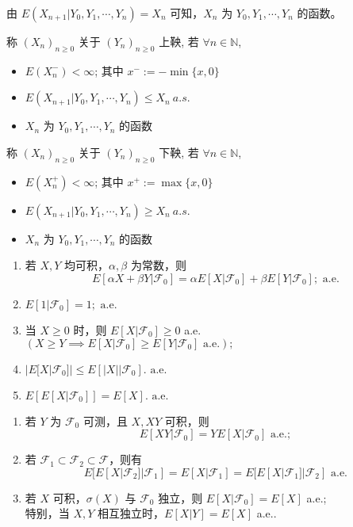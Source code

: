 \documentclass[lang=cn,10pt,thmcnt=section]{elegantbook}
\begin{document}
\begin{remark}
	由 $E(X_{n+1} | Y_0, Y_1, \cdots, Y_n) = X_n$ 可知，$X_n$ 为 $Y_0, Y_1, \cdots, Y_n$ 的函数。
\end{remark}
\begin{definition}[上鞅]
	称 $(X_n)_{n \geq 0}$ 关于 $(Y_n)_{n \geq 0}$ 上鞅, 若 $\forall n \in \mathbb{N}$,
\begin{itemize}
    \item $E(X_n^-) < \infty$; 其中 $x^- := -\min\{x, 0\}$
    \item $E(X_{n+1} | Y_0, Y_1, \cdots, Y_n) \leq X_n \ a.s.$
    \item $X_n$ 为 $Y_0, Y_1, \cdots, Y_n$ 的函数
\end{itemize}
\end{definition}
\begin{definition}[下鞅]
	称 $(X_n)_{n \geq 0}$ 关于 $(Y_n)_{n \geq 0}$ 下鞅, 若 $\forall n \in \mathbb{N}$,
\begin{itemize}
    \item $E(X_n^+) < \infty$; 其中 $x^+ := \max\{x, 0\}$
    \item $E(X_{n+1} | Y_0, Y_1, \cdots, Y_n) \geq X_n \ a.s.$
    \item $X_n$ 为 $Y_0, Y_1, \cdots, Y_n$ 的函数
\end{itemize}
\end{definition}
\begin{theorem}\label{1.5}
	\begin{enumerate}
		\item 若 $X, Y$ 均可积，$\alpha, \beta$ 为常数，则
		\[
		E[\alpha X + \beta Y|\mathscr{F}_0] = \alpha E[X|\mathscr{F}_0] + \beta E[Y|\mathscr{F}_0]; \text{ a.e.}
		\]
		\item $E[1|\mathscr{F}_0] = 1; \text{ a.e.}$
		\item 当 $X \geq 0$ 时，则 $E[X|\mathscr{F}_0] \geq 0$ a.e. \\
		$(X \geq Y \implies E[X|\mathscr{F}_0] \geq E[Y|\mathscr{F}_0] \text{ a.e.});$
		\item $|E[X|\mathscr{F}_0]| \leq E[|X||\mathscr{F}_0]. \text{ a.e.}$
		\item $E[E[X|\mathscr{F}_0]] = E[X]. \text{ a.e.}$
	\end{enumerate}
\end{theorem}
\begin{theorem}\label{1.6}
	\begin{enumerate}
		\item 若 $Y$ 为 $\mathscr{F}_0$ 可测，且 $X, XY$ 可积，则
		\[
		E[XY|\mathscr{F}_0] = Y E[X|\mathscr{F}_0] \text{ a.e.};
		\]
		\item 若 $\mathscr{F}_1 \subset \mathscr{F}_2 \subset \mathscr{F}$，则有
		\[
		E[E[X|\mathscr{F}_2]|\mathscr{F}_1] = E[X|\mathscr{F}_1] = E[E[X|\mathscr{F}_1]|\mathscr{F}_2] \text{ a.e.}
		\]
		\item 若 $X$ 可积，$\sigma(X)$ 与 $\mathscr{F}_0$ 独立，则 $E[X|\mathscr{F}_0] = E[X]$ a.e.; \\
		特别，当 $X, Y$ 相互独立时，$E[X|Y] = E[X]$ a.e..
	\end{enumerate}
\end{theorem}
\end{document}
